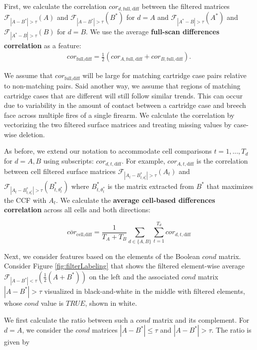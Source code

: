 \documentclass[11pt,]{isuthesis}
\begin{document}
First, we calculate the correlation \(cor_{d,\text{full},\text{diff}}\) between the filtered matrices \(\mathcal{F}_{|A - B^*| > \tau}(A)\) and \(\mathcal{F}_{|A - B^*| > \tau}(B^*)\) for \(d = A\) and \(\mathcal{F}_{|A^* - B| > \tau}(A^*)\) and \(\mathcal{F}_{|A^* - B| > \tau}(B)\) for \(d = B\).
We use the average \textbf{full-scan differences correlation} as a feature:
\begin{align*}
cor_{\text{full},\text{diff}} = \frac{1}{2}\left(cor_{A,\text{full},\text{diff}} + cor_{B,\text{full},\text{diff}}\right).
\end{align*}

We assume that \(cor_{\text{full},\text{diff}}\) will be large for matching cartridge case pairs relative to non-matching pairs.
Said another way, we assume that regions of matching cartridge cases that are different will still follow similar trends.
This can occur due to variability in the amount of contact between a cartridge case and breech face across multiple fires of a single firearm.
We calculate the correlation by vectorizing the two filtered surface matrices and treating missing values by case-wise deletion.

As before, we extend our notation to accommodate cell comparisons \(t = 1,...,T_d\) for \(d = A,B\) using subscripts: \(cor_{d,t,\text{diff}}\).
For example, \(cor_{A,t,\text{diff}}\) is the correlation between cell filtered surface matrices \(\mathcal{F}_{|A_t - B_{t,\theta_t^*}^*| > \tau}(A_t)\) and \(\mathcal{F}_{|A_t - B_{t,\theta_t^*}^*| > \tau}(B_{t,\theta_t^*}^*)\) where \(B_{t,\theta_t^*}^*\) is the matrix extracted from \(B^*\) that maximizes the CCF with \(A_t\).
We calculate the \textbf{average cell-based differences correlation} across all cells and both directions:

\[
\overline{cor}_{\text{cell},\text{diff}} = \frac{1}{T_A + T_B} \sum_{d \in \{A,B\}} \sum_{t=1}^{T_d} cor_{d,t,\text{diff}}
\]

Next, we consider features based on the elements of the Boolean \(cond\) matrix.
Consider Figure \ref{fig:filterLabeling} that shows the filtered element-wise average \(\mathcal{F}_{|A - B^*| < \tau}\left(\frac{1}{2}(A + B^*)\right)\) on the left and the associated \(cond\) matrix \(|A - B^*| > \tau\) visualized in black-and-white in the middle with filtered elements, whose \(cond\) value is \(TRUE\), shown in white.

We first calculate the ratio between such a \(cond\) matrix and its complement.
For \(d = A\), we consider the \(cond\) matrices \(|A - B^*| \leq \tau\) and \(|A - B^*| > \tau\).
The ratio is given by
\end{document}
